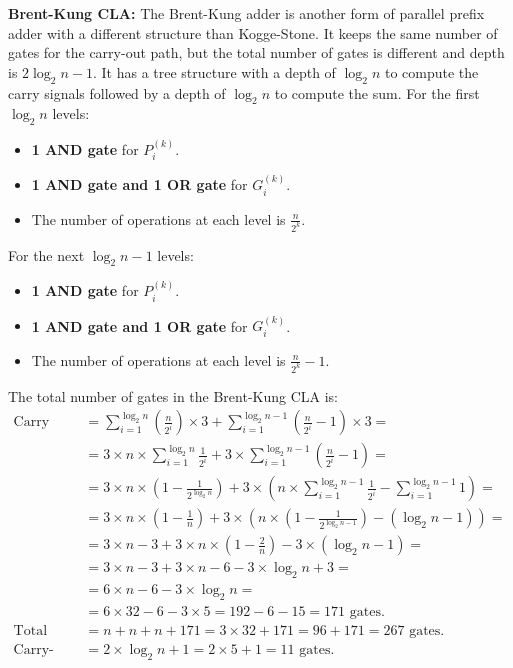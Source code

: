 \textbf{Brent-Kung CLA:}
The Brent-Kung adder is another form of parallel prefix adder with a different structure than Kogge-Stone.
It keeps the same number of gates for the carry-out path, but the total number of gates is different and depth is $2 \log_2 n - 1$.
It has a tree structure with a depth of $\log_2 n$ to compute the carry signals followed by a depth of $\log_2 n$ to compute the sum.
For the first $\log_2 n$ levels:
\begin{itemize}
    \item \textbf{1 AND gate} for $P_i^{(k)}$.
    \item \textbf{1 AND gate and 1 OR gate} for $G_i^{(k)}$.
    \item The number of operations at each level is $ \frac{n}{2^{k}}$.
\end{itemize}
For the next $\log_2 n - 1$ levels:
\begin{itemize}
    \item \textbf{1 AND gate} for $P_i^{(k)}$.
    \item \textbf{1 AND gate and 1 OR gate} for $G_i^{(k)}$.
    \item The number of operations at each level is $\frac{n}{2^{k}} - 1$.
\end{itemize}

The total number of gates in the Brent-Kung CLA is:
\begin{equation*}
    \begin{split}
\text{Carry Gates} & = \sum_{i=1}^{\log_2 n} \left( \frac{n}{2^{i}} \right) \times 3 + \sum_{i=1}^{\log_2 n - 1} \left( \frac{n}{2^{i}} - 1 \right) \times 3 = \\
                  & = 3 \times n \times \sum_{i=1}^{\log_2 n} \frac{1}{2^{i}} + 3 \times \sum_{i=1}^{\log_2 n - 1} \left( \frac{n}{2^{i}} - 1 \right) = \\
                  & = 3 \times n \times \left( 1 - \frac{1}{2^{\log_2 n}} \right) + 3 \times \left( n \times \sum_{i=1}^{\log_2 n - 1} \frac{1}{2^{i}} - \sum_{i=1}^{\log_2 n - 1} 1 \right) = \\
                    & = 3 \times n \times \left( 1 - \frac{1}{n} \right) + 3 \times \left( n \times \left( 1 - \frac{1}{2^{\log_2 n - 1}} \right) - \left( \log_2 n - 1 \right) \right) = \\
                  & = 3 \times n - 3 + 3 \times n \times \left( 1 - \frac{2}{n} \right) - 3 \times \left( \log_2 n - 1 \right) = \\
                    & = 3 \times n - 3 + 3 \times n - 6 - 3 \times \log_2 n + 3 = \\
                    & = 6 \times n - 6 - 3 \times \log_2 n = \\
                    & = 6 \times 32 - 6 - 3 \times 5 = 192 - 6 - 15 = 171 \text{ gates}. \\
\text{Total gates} & = n + n + n + 171 =  3 \times 32 + 171 = 96 + 171 = 267 \text{ gates}. \\
\text{Carry-out path} & = 2 \times \log_2 n + 1 = 2 \times 5 + 1 = 11 \text{ gates}.
    \end{split}
\end{equation*}
